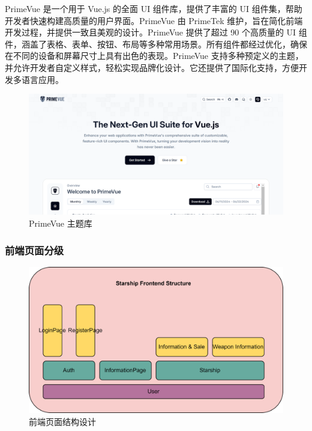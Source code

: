 \documentclass{base}
\begin{document}
PrimeVue 是一个用于 Vue.js 的全面 UI 组件库，提供了丰富的 UI 组件集，帮助开发者快速构建高质量的用户界面。PrimeVue 由 PrimeTek 维护，旨在简化前端开发过程，并提供一致且美观的设计。PrimeVue 提供了超过 90 个高质量的 UI 组件，涵盖了表格、表单、按钮、布局等多种常用场景。所有组件都经过优化，确保在不同的设备和屏幕尺寸上具有出色的表现。PrimeVue 支持多种预定义的主题，并允许开发者自定义样式，轻松实现品牌化设计。它还提供了国际化支持，方便开发多语言应用。

\begin{figure}[H]
	\centering
	\includegraphics[width=\linewidth]{images/PrimeVue}
	\caption{PrimeVue 主题库}
	\label{fig:primevue}
\end{figure}

\subsubsection{前端页面分级}

\begin{figure}[H]
	\centering
	\includegraphics[width=\linewidth]{images/FrontEndPageLayers}
	\caption{前端页面结构设计}
	\label{fig:frontendpagelayers}
\end{figure}
\end{document}
